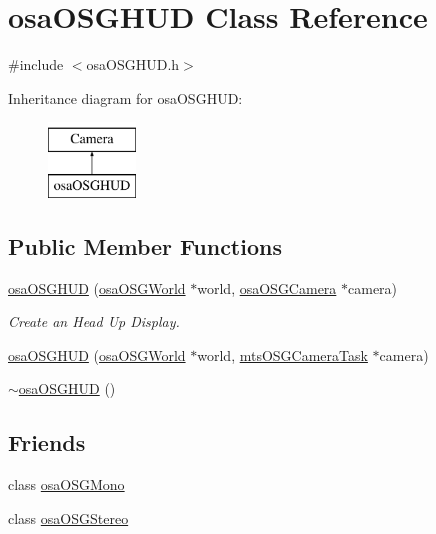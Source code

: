 \hypertarget{classosa_o_s_g_h_u_d}{\section{osa\-O\-S\-G\-H\-U\-D Class Reference}
\label{classosa_o_s_g_h_u_d}
}


{\ttfamily \#include $<$osa\-O\-S\-G\-H\-U\-D.\-h$>$}

Inheritance diagram for osa\-O\-S\-G\-H\-U\-D\-:\begin{figure}[H]
\begin{center}
\leavevmode
\includegraphics[height=2.000000cm]{d1/d41/classosa_o_s_g_h_u_d}
\end{center}
\end{figure}
\subsection*{Public Member Functions}
\begin{DoxyCompactItemize}
\item 
\hyperlink{classosa_o_s_g_h_u_d_a935ac028cb72a8cee52b68b525e7ca29}{osa\-O\-S\-G\-H\-U\-D} (\hyperlink{classosa_o_s_g_world}{osa\-O\-S\-G\-World} $\ast$world, \hyperlink{classosa_o_s_g_camera}{osa\-O\-S\-G\-Camera} $\ast$camera)
\begin{DoxyCompactList}\small\item\em Create an Head Up Display. \end{DoxyCompactList}\item 
\hyperlink{classosa_o_s_g_h_u_d_acba8d1909e79c88d75e37ca54ea10cfc}{osa\-O\-S\-G\-H\-U\-D} (\hyperlink{classosa_o_s_g_world}{osa\-O\-S\-G\-World} $\ast$world, \hyperlink{classmts_o_s_g_camera_task}{mts\-O\-S\-G\-Camera\-Task} $\ast$camera)
\item 
\hyperlink{classosa_o_s_g_h_u_d_a0ff4387fe4857e21c1bc305fa6261de0}{$\sim$osa\-O\-S\-G\-H\-U\-D} ()
\end{DoxyCompactItemize}
\subsection*{Friends}
\begin{DoxyCompactItemize}
\item 
class \hyperlink{classosa_o_s_g_h_u_d_a634b1c90f4ef3f117b24b0dca82f81b9}{osa\-O\-S\-G\-Mono}
\item 
class \hyperlink{classosa_o_s_g_h_u_d_a579b6ba3b0d1fba394d73937c399dc67}{osa\-O\-S\-G\-Stereo}
\end{DoxyCompactItemize}


